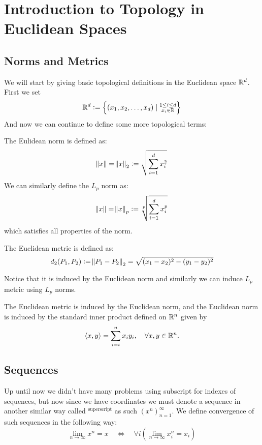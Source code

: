 \documentclass[11pt,a4paper]{article}
\begin{document}
\maketitle


\newpage
\tableofcontents
\newpage

\section{Introduction to Topology in Euclidean Spaces}
\subsection{Norms and Metrics}
We will start by giving basic topological definitions in the Euclidean 
space $\mathbb{R}^d$. First we set
\[
  \mathbb{R}^d := \set{(x_1,x_2,\dots,x_d) \mid \substack{1 \le i \le d \\ x_i\in\mathbb{R}}}
\]
And now we can continue to define some more topological terms:

\begin{definition}
The Eulidean norm is defined as:
\[
  \norm{x} = \norm{x}_2 := \sqrt{\sum_{i=1}^{d}{x_i^2}}
\]
We can similarly define the $L_p$ norm as:
\[
  \norm{x} = \norm{x}_p := \sqrt[p]{\sum_{i=1}^{d}{x_i^p}}
\]
which satisfies all properties of the norm.
\end{definition}

\begin{definition}
The Euclidean metric is defined as:
\[
  d_2(P_1,P_2) := \norm{P_1-P_2}_2 = \sqrt{(x_1-x_2)^2 - (y_1-y_2)^2}
\]
\end{definition}
\noindent Notice that it is induced by the Euclidean norm and similarly
we can induce $L_p$ metric using $L_p$ norms.

\begin{remark}
  The Euclidean metric is induced by the Euclidean norm, and the Euclidean
  norm is induced by the standard inner product defined on $\mathbb{R}^n$
  given by
  \[
    \langle x, y \rangle = \sum_{i=i}^{n} x_i y_i, \quad \forall x,y \in \mathbb{R}^n.
  \]
\end{remark}

\subsection{Sequences}
Up until now we didn't have many problems using subscript for indexes
of sequences, but now since we have coordinates we must denote a sequence
in another similar way called $^{\text{superscript}}$ as such 
$(x^n)_{n=1}^{\infty}$. We define convergence of such sequences in
the following way:
\[
  \lim_{n\to\infty}{x^n} = x 
  \quad \iff \quad
  \forall i\left(\lim_{n\to\infty}{x_i^n} = x_i\right)
\]
\end{document}
